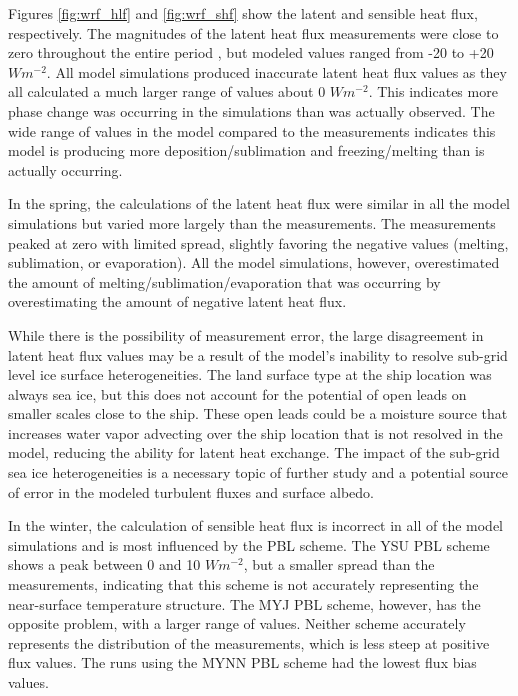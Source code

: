 Figures \ref{fig:wrf_hlf} and \ref{fig:wrf_shf} show the latent and sensible heat flux, respectively. The magnitudes of the latent heat flux measurements were close to zero throughout the entire period \citep{walden:2017}, but modeled values ranged from -20 to +20 $Wm^{-2}$. All model simulations produced inaccurate latent heat flux values as they all calculated a much larger range of values about 0 $Wm^{-2}$. This indicates more phase change was occurring in the simulations than was actually observed. The wide range of values in the model compared to the measurements indicates this model is producing more deposition/sublimation and freezing/melting than is actually occurring. 

In the spring, the calculations of the latent heat flux were similar in all the model simulations but varied more largely than the measurements. The measurements peaked at zero with limited spread, slightly favoring the negative values (melting, sublimation, or evaporation). All the model simulations, however, overestimated the amount of melting/sublimation/evaporation that was occurring by overestimating the amount of negative latent heat flux. 

While there is the possibility of measurement error, the large disagreement in latent heat flux values may be a result of the model's inability to resolve sub-grid level ice surface heterogeneities. The land surface type at the ship location was always sea ice, but this does not account for the potential of open leads on smaller scales close to the ship. These open leads could be a moisture source that increases water vapor advecting over the ship location that is not resolved in the model, reducing the ability for latent heat exchange. The impact of the sub-grid sea ice heterogeneities is a necessary topic of further study and a potential source of error in the modeled turbulent fluxes and surface albedo. 

In the winter, the calculation of sensible heat flux is incorrect in all of the model simulations and is most influenced by the PBL scheme. The YSU PBL scheme shows a peak between 0 and 10 $Wm^{-2}$, but a smaller spread than the measurements, indicating that this scheme is not accurately representing the near-surface temperature structure. The MYJ PBL scheme, however, has the opposite problem, with a larger range of values. Neither scheme accurately represents the distribution of the measurements, which is less steep at positive flux values. The runs using the MYNN PBL scheme had the lowest flux bias values.

